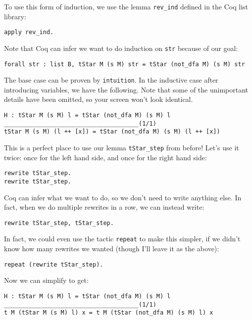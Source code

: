 To use this form of induction, we use the lemma \texttt{rev_ind} defined in the Coq list library:

\begin{verbatim}
apply rev_ind.
\end{verbatim}

Note that Coq can infer we want to do induction on \texttt{str} because of our goal:

\begin{verbatim}
forall str : list B, tStar M (s M) str = tStar (not_dfa M) (s M) str
\end{verbatim}

The base case can be proven by \texttt{intuition}.
In the inductive case after introducing variables, we have the following.
Note that some of the unimportant details have been omitted, so your screen won't look identical.

\begin{verbatim}
H : tStar M (s M) l = tStar (not_dfa M) (s M) l
______________________________________(1/1)
tStar M (s M) (l ++ [x]) = tStar (not_dfa M) (s M) (l ++ [x])
\end{verbatim}

This is a perfect place to use our lemma \texttt{tStar_step} from before!
Let's use it twice: once for the left hand side, and once for the right hand side:

\begin{verbatim}
rewrite tStar_step.
rewrite tStar_step.
\end{verbatim}

Coq can infer what we want to do, so we don't need to write anything else.
In fact, when we do multiple rewrites in a row, we can instead write:

\begin{verbatim}
rewrite tStar_step, tStar_step.
\end{verbatim}

In fact, we could even use the tactic \texttt{repeat} to make this simpler, if we didn't know how many rewrites we wanted (though I'll leave it as the above):

\begin{verbatim}
repeat (rewrite tStar_step).
\end{verbatim}

Now we can simplify to get:

\begin{verbatim}
H : tStar M (s M) l = tStar (not_dfa M) (s M) l
______________________________________(1/1)
t M (tStar M (s M) l) x = t M (tStar (not_dfa M) (s M) l) x
\end{verbatim}

